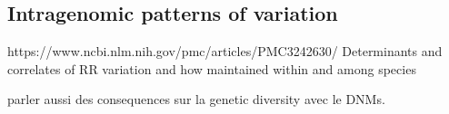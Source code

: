 \subsection{Intragenomic patterns of variation}






%




https://www.ncbi.nlm.nih.gov/pmc/articles/PMC3242630/
Determinants and correlates of RR variation and how maintained within and among species


parler aussi des consequences sur la genetic diversity avec le DNMs.

